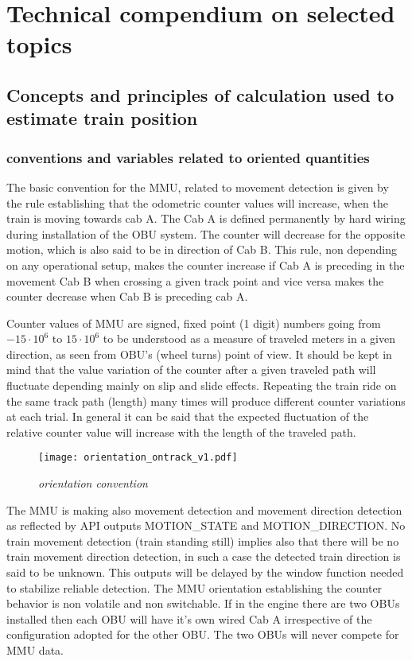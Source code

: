\appendix
\chapter{Technical compendium on selected topics}
\section{Concepts and principles of calculation used to estimate train position}

\subsection{conventions and variables related to oriented quantities}

The basic convention for the \gls{MMU}, related to movement detection is given by the rule establishing that the odometric counter values will increase, when the train is moving towards cab A. The Cab A is defined permanently by hard wiring during installation of the \gls{OBU} system. The counter will decrease for the opposite  motion, which is also said to be in direction of Cab B. 
This rule, non depending on any operational setup, makes the counter increase if Cab A is preceding in the movement Cab B when crossing a given track point and vice versa makes the counter decrease when Cab B is preceding cab A.

Counter values of \gls{MMU} are signed, fixed point (1 digit) numbers going from $-15 \cdot 10^6$ to $15 \cdot 10^6$ to be understood as a measure of traveled meters in a given direction, as seen from \gls{OBU}'s (wheel turns) point of view. It should be kept in mind that the value variation of the counter after a given traveled path will fluctuate depending mainly on slip and slide effects. Repeating the train ride on the same track path (length) many times will produce different counter variations at each trial. In general it can be said that the expected fluctuation of the relative counter value will increase with the length of the traveled path.
\begin{figure}[ht!]
\centerline{
\texttt{[image: orientation\_ontrack\_v1.pdf]}
}
\caption{\emph{orientation convention}}
\label {fig:orientation}
\end{figure}

The \gls{MMU} is making also movement detection and movement direction detection as reflected by API outputs MOTION\_STATE and MOTION\_DIRECTION. No train movement detection (train standing still) implies also that there will be no train movement direction detection, in such a case the detected train direction is said to be unknown. This outputs will be delayed by the window function needed to stabilize reliable detection. 
The \gls{MMU} orientation establishing the counter behavior is non volatile and non switchable. If in the engine there are two \gls{OBU}s installed then each \gls{OBU} will have it's own wired Cab A irrespective of the configuration adopted for the other \gls{OBU}. The two \gls{OBU}s will never compete for \gls{MMU} data.

